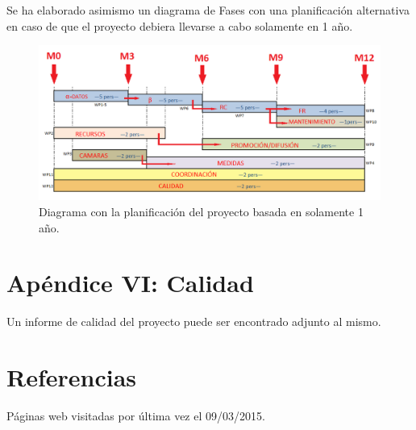 \documentclass[12pt,oneside,a4paper]{article}
\numberwithin{figure}{section}
\begin{document}
Se ha elaborado asimismo un diagrama de Fases con una planificación alternativa en caso de que el proyecto debiera llevarse a cabo solamente en 1 año.

\begin{figure}[H]
\begin{center}
\includegraphics[scale=.6]{Diagrama_GP.png}
\caption{Diagrama  con la planificación del proyecto basada en solamente 1 año.}
\end{center}
\end{figure}


\section{Apéndice VI: Calidad}

Un informe de calidad del proyecto puede ser encontrado adjunto al mismo.


\section{Referencias}

Páginas web visitadas por última vez el 09/03/2015.
\end{document}

